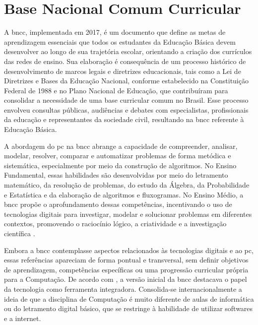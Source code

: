 \section{ Base Nacional Comum Curricular }
A \gls{bncc}, implementada em 2017, é um documento
que define as metas de aprendizagem essenciais que todos os estudantes da
Educação Básica devem desenvolver ao longo de sua trajetória escolar, orientando
a criação dos currículos das redes de ensino. Sua elaboração é consequência de um
processo histórico de desenvolvimento de marcos legais e diretrizes educacionais, tais
como a Lei de Diretrizes e Bases da Educação Nacional, conforme estabelecido na
Constituição Federal de 1988 e no Plano Nacional de Educação, que contribuíram
para consolidar a necessidade de uma base curricular comum no Brasil. Esse
processo envolveu consultas públicas, audiências e debates com especialistas,
profissionais da educação e representantes da sociedade civil, resultando na
\gls{bncc} referente à Educação Básica.

A abordagem do \gls{pc} na \gls{bncc} abrange a capacidade de compreender, analisar,
modelar, resolver, comparar e automatizar problemas de forma metódica e
sistemática, especialmente por meio da construção de algoritmos. No Ensino
Fundamental, essas habilidades são desenvolvidas por meio do letramento
matemático, da resolução de problemas, do estudo da Álgebra, da Probabilidade e
Estatística e da elaboração de algoritmos e fluxogramas. No Ensino Médio,
a \gls{bncc} propõe o aprofundamento dessas competências, incentivando o uso de tecnologias
digitais para investigar, modelar e solucionar problemas em diferentes
contextos, promovendo o raciocínio lógico, a criatividade e a investigação
científica \cite{brasil2017}.

Embora a \gls{bncc} contemplasse aspectos relacionados às tecnologias digitais e ao
\gls{pc}, essas referências apareciam de forma pontual e transversal, sem definir
objetivos de aprendizagem, competências específicas ou uma progressão curricular
própria para a Computação. De acordo com , a
versão inicial da \gls{bncc} destacava o papel da tecnologia como ferramenta
integradora. Consolida-se internacionalmente a ideia de que a
disciplina de Computação é muito diferente de aulas de informática ou
do letramento digital básico, que se restringe à habilidade de utilizar
softwares e a internet.

